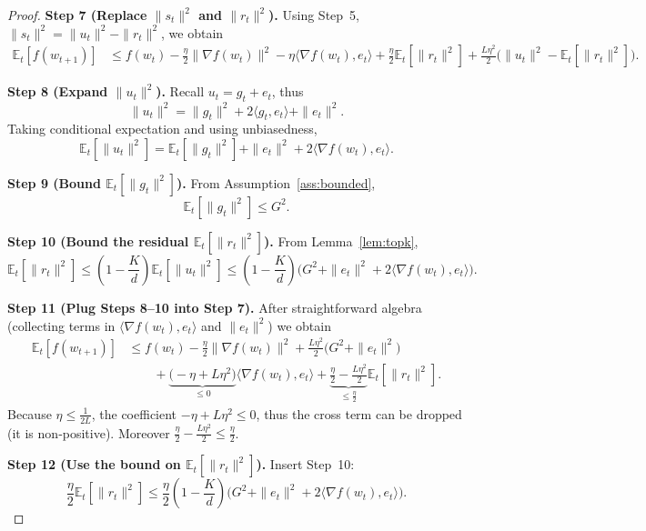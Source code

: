\documentclass[11pt]{article}
\begin{document}
\begin{proof}
\textbf{Step 7 (Replace $\|s_{t}\|^{2}$ and $\|r_{t}\|^{2}$).}  
Using Step~5, $\|s_{t}\|^{2}= \|u_{t}\|^{2}-\|r_{t}\|^{2}$, we obtain
\begin{align}
\mathbb{E}_{t}[f(w_{t+1})]
&\le f(w_{t})-\frac{\eta}{2}\|\nabla f(w_{t})\|^{2}
-\eta\langle\nabla f(w_{t}),e_{t}\rangle
+\frac{\eta}{2}\mathbb{E}_{t}[\|r_{t}\|^{2}]
+\frac{L\eta^{2}}{2}\big(\|u_{t}\|^{2}-\mathbb{E}_{t}[\|r_{t}\|^{2}]\big). \tag{Step 7}
\end{align}

\textbf{Step 8 (Expand $\|u_{t}\|^{2}$).}  
Recall $u_{t}=g_{t}+e_{t}$, thus
\[
\|u_{t}\|^{2}= \|g_{t}\|^{2}+2\langle g_{t},e_{t}\rangle+\|e_{t}\|^{2}.
\]
Taking conditional expectation and using unbiasedness,
\[
\mathbb{E}_{t}[\|u_{t}\|^{2}]
= \mathbb{E}_{t}[\|g_{t}\|^{2}]+\|e_{t}\|^{2}+2\langle\nabla f(w_{t}),e_{t}\rangle.
\tag{Step 8}
\]

\textbf{Step 9 (Bound $\mathbb{E}_{t}[\|g_{t}\|^{2}]$).}  
From Assumption~\ref{ass:bounded},
\[
\mathbb{E}_{t}[\|g_{t}\|^{2}]\le G^{2}.
\tag{Step 9}
\]

\textbf{Step 10 (Bound the residual $\mathbb{E}_{t}[\|r_{t}\|^{2}]$).}  
From Lemma~\ref{lem:topk},
\[
\mathbb{E}_{t}[\|r_{t}\|^{2}]
\le\left(1-\frac{K}{d}\right)\mathbb{E}_{t}[\|u_{t}\|^{2}]
\le\left(1-\frac{K}{d}\right)\big(G^{2}+\|e_{t}\|^{2}+2\langle\nabla f(w_{t}),e_{t}\rangle\big).
\tag{Step 10}
\]

\textbf{Step 11 (Plug Steps 8–10 into Step 7).}  
After straightforward algebra (collecting terms in $\langle\nabla f(w_{t}),e_{t}\rangle$ and $\|e_{t}\|^{2}$) we obtain
\begin{align}
\mathbb{E}_{t}[f(w_{t+1})]
&\le f(w_{t})-\frac{\eta}{2}\|\nabla f(w_{t})\|^{2}
+ \frac{L\eta^{2}}{2}\big(G^{2}+\|e_{t}\|^{2}\big) \nonumber\\
&\qquad +\underbrace{\Big(-\eta+\!L\eta^{2}\Big)}_{\le 0}
\langle\nabla f(w_{t}),e_{t}\rangle
+\underbrace{\frac{\eta}{2}-\frac{L\eta^{2}}{2}}_{\le \frac{\eta}{2}}
\mathbb{E}_{t}[\|r_{t}\|^{2}].
\tag{Step 11}
\end{align}
Because $\eta\le\frac{1}{2L}$, the coefficient $-\eta+L\eta^{2}\le0$, thus the cross term can be dropped (it is non‑positive). Moreover $\frac{\eta}{2}-\frac{L\eta^{2}}{2}\le\frac{\eta}{2}$.

\textbf{Step 12 (Use the bound on $\mathbb{E}_{t}[\|r_{t}\|^{2}]$).}  
Insert Step~10:
\[
\frac{\eta}{2}\mathbb{E}_{t}[\|r_{t}\|^{2}]
\le \frac{\eta}{2}\!\left(1-\frac{K}{d}\right)\!\big(G^{2}+\|e_{t}\|^{2}+2\langle\nabla f(w_{t}),e_{t}\rangle\big).
\tag{Step 12}
\]


\end{proof}
\end{document}
